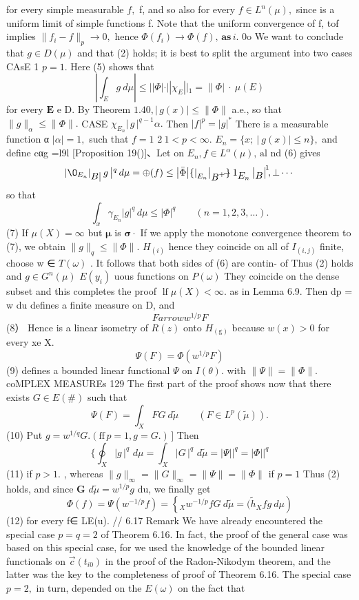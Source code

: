 for every simple measurable $f,$ f, and so also for every $f\in L^{n}(\mu),$ since is a uniform limit of simple functions f. Note that the uniform convergence of f, tof implies $\|f_{i}-f\|_{p}\to0,$ hence $\Phi(f_{i})\to\Phi(f),\,\mathbf{as}\,i.$ 0o We want to conclude that $g\in D(\mu)$ and that (2) holds; it is best to split the argument into two cases CAsE 1 $p=1.$ Here (5) shows that $$ \left|\int_{E}g\ d\mu\right|\leq||\Phi|\cdot||\chi_{E}||_{1}=\|\Phi|\ \cdot\ \mu(E) $$ for every $\boldsymbol{E}$ e D. By Theorem $1.40,|\,g(x)|\leq\|\Phi\|$ a.e., so that $\|g\|_{\alpha}\leq\|\Phi\|.$ CASE $\chi_{E_{n}}|\,g\,|^{q-1}\alpha.$ Then $|f|^{p}=|g|^{*}$ There is a measurable function α $|\alpha|=1,$ such that $f=1$ $2\ 1<p<\infty.$ $E_{n}=\{x;\ |\ g(x)|\leq n\},$ and define cαg =l9l [Proposition 19()]、Let on $E_{n},f\in L^{\alpha}(\mu),\,{\mathrm{al}}$ nd (6) gives $$ \left|\O_{E_{n}}\right|_{\displaystyle B|}g\left|^{q}\,d\mu=\oplus(f)\leq\left|\bar{\Phi}\right|\!\left\{\right|_{E_{n}}\right|_{\displaystyle B^{+}} \}\!\!\!\!\!\!-1_{\displaystyle E_{n}}\left|\vphantom{D}_{\displaystyle B}\right|^{\!1}\!\!,\bot\cdots $$ so that $$ \int_{x}\gamma_{E_{n}}\vert g\vert^{q}\,d\mu\leq\vert\Phi\vert^{q}\qquad(n=1,2,3,\ldots). $$ (7) If $\mu(X)=\infty$ but ${\boldsymbol{\mu}}$ is ${\boldsymbol{\sigma}}\cdot$ If we apply the monotone convergence theorem to (7), we obtain $\|g\|_{q}\leq\|\Phi\|.$ $\scriptstyle{H_{(i)}}$ hence they coincide on all of $\scriptstyle I_{(i,j)}$ finite, choose w ∈ $\scriptstyle T(\omega)$ . It follows that both sides of (6) are contin- of Thus (2) holds and $g\in G^{n}(\mu)$ $\scriptstyle{E(y_{i})}$ uous functions on $\scriptstyle{P(\omega)}$ They coincide on the dense subset and this completes the proof $\operatorname{lf}\mu(X)<\infty.$ as in Lemma 6.9. Then dp = w du defines a finite measure on D, and $$ F arrow w^{1/p}F $$ (8） Hence is a linear isometry of $\scriptstyle R(z)$ onto $\scriptstyle H_{\mathrm{(g)}}$ because $w(x)>0$ for every xe X. $$ \Psi(F)=\Phi(w^{1/p}F) $$ (9) defines a bounded linear functional $\Psi$ on $\scriptstyle I(\theta).$ with $\|\Psi\|=\|\Phi\|.$coMPLEX MEASUREs 129 The first part of the proof shows now that there exists $G\in E(\#)$ such that $$ \Psi(F)=\int_{X}\!F G\ d{\tilde{\mu}}\qquad(F\in L^{p}({\tilde{\mu}})). $$ (10) Put $g=w^{1/q}G.(\mathrm{ff}\,p=1,g=G.)\,]$ Then $$ \{\oint_{X}\vert g\,\vert^{q}\,\,d\mu=\int_{X}\vert G\,\vert^{q}\,\,d\tilde{\mu}=\vert\Psi\vert\vert^{q}=\vert\Phi\vert\vert^{q} $$ (11) if $p>1.$ , whereas $\|g\|_{\infty}=\|G\|_{\infty}=\|\Psi\|=\|\Phi\|$ if $\scriptstyle{p=1}$ Thus (2) holds, and since ${\boldsymbol{G}}$ $d{\tilde{\mu}}=w^{1/p}g$ du, we finally get $$ \Phi(f)=\Psi(w^{-1/p}f)=\left\{_{X}w^{-1/p}f G\ d\tilde{\mu}= (\tilde{h}_{X}f g\ d\mu\right) $$ (12) for every f∈ LE(u). // 6.17 Remark We have already encountered the special case $p=q=2$ of Theorem 6.16. In fact, the proof of the general case was based on this special case, for we used the knowledge of the bounded linear functionals on $\scriptstyle{\vec{c}}(t_{i0})$ in the proof of the Radon-Nikodym theorem, and the latter was the key to the completeness of proof of Theorem 6.16. The special case $p=2,$ in turn, depended on the $\scriptstyle{E(\omega)}$ on the fact that 